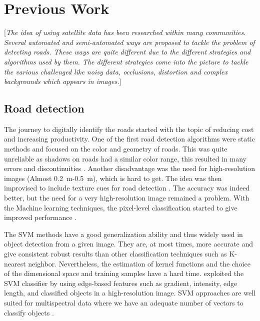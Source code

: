 \chapter{Previous Work}\label{chapt:previous}
[\textit{The idea of using satellite data has been researched within many communities. Several automated and semi-automated ways are proposed to tackle the problem of detecting roads. These ways are quite different due to the different strategies and algorithms used by them. The different strategies come into the picture to tackle the various challenged like noisy data, occlusions, distortion and complex backgrounds which appears in images.}]

\section{Road detection}
The journey to digitally identify the roads started with the topic of reducing cost and increasing productivity. One of the first road detection algorithms were static methods and focused on the color and geometry of roads. This was quite unreliable as shadows on roads had a similar color range, this resulted in many errors and discontinuities \cite{Detecting_interections_using_color,Detecting_roads_using_color}. Another disadvantage was the need for high-resolution images (Almost 0.2~m-0.5~m), which is hard to get. The idea was then improvised to include texture cues for road detection \cite{using_texture_for_road_detection,baumgartner1999automatic}. The accuracy was indeed better, but the need for a very high-resolution image remained a problem. With the Machine learning techniques, the pixel-level classification started to give improved performance \cite{road_detection_using_neural_nets_SVM,road_detection_using_env_learning,road_detection_using_SVM_online_learning}.

The SVM methods have a good generalization ability and thus widely used in object detection from a given image. They are, at most times, more accurate and give consistent robust results than other classification techniques such as K-nearest neighbor. Nevertheless, the estimation of kernel functions and the choice of the dimensional space and training samples have a hard time. %
exploited the SVM classifier by using edge-based features such as gradient, intensity, edge length, and classified objects in a high-resolution image. SVM approaches are well suited for multispectral data where we have an adequate number of vectors to classify objects %
.

